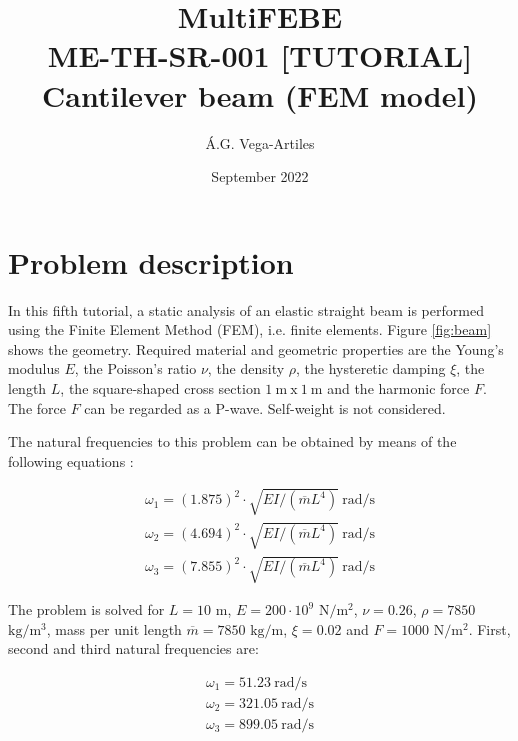 \documentclass[a4]{article}
\title{MultiFEBE \\ ME-TH-SR-001 [TUTORIAL] \\ Cantilever beam (FEM model)}
\author{\'A.G. Vega-Artiles}
\date{September 2022}
\begin{document}
\maketitle

\tableofcontents 

\section{Problem description}

In this fifth tutorial, a static analysis of an elastic straight beam is performed using the Finite Element Method (FEM), i.e. finite elements. Figure \ref{fig:beam} shows the geometry. Required material and geometric properties are the Young's modulus $E$, the Poisson's ratio $\nu$, the density $\rho$, the hysteretic damping $\xi$, the length $L$, the square-shaped cross section $1 \medspace \mathrm{m} \medspace \mathrm{x} \medspace 1 \medspace \mathrm{m}$ and the harmonic force $F$. The force $F$ can be regarded as a P-wave. Self-weight is not considered. 

The natural frequencies to this problem can be obtained by means of the following equations \cite{clough}:

\begin{equation}
	\begin{array}{l}
		\omega_1 = (1.875)^2 \cdot \sqrt{EI /(\overline{m}L^4)} \medspace \mathrm{rad/s} \\
		\omega_2 = (4.694)^2 \cdot \sqrt{EI /(\overline{m}L^4)} \medspace \mathrm{rad/s} \\
		\omega_3 = (7.855)^2 \cdot \sqrt{EI /(\overline{m}L^4)} \medspace \mathrm{rad/s}
	\end{array}
\end{equation}

The problem is solved for $L=10$ $\mathrm{m}$, $E=200\cdot 10^9$ $\mathrm{N/m^2}$, $\nu=0.26$, $\rho=7850$ $\mathrm{kg/m^3}$, mass per unit length $\overline{m}=7850$ $\mathrm{kg/m}$, $\xi=0.02$ and $F=1000$ $\mathrm{N/m^2}$. First, second and third natural frequencies are: 

\begin{equation}
	\begin{array}{l}
		\omega_1 = 51.23 \medspace \mathrm{rad/s} \\
		\omega_2 = 321.05 \medspace \mathrm{rad/s} \\
		\omega_3 = 899.05 \medspace \mathrm{rad/s}
	\end{array}
\end{equation}
\end{document}
